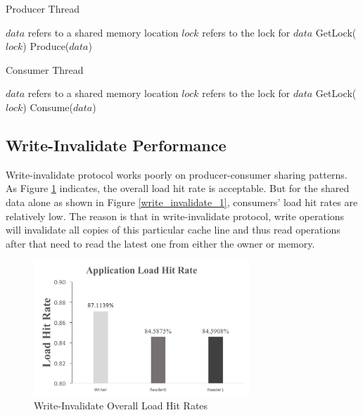 \documentclass[11pt,conference]{IEEEtran}
\begin{document}
\begin{algorithm}
\caption{Producer Thread}
\label{producer_thread}
\begin{algorithmic}[1]
\State $data$ refers to a shared memory location
\State $lock$ refers to the lock for $data$
    \State GetLock($lock$) 
    \State Produce($data$)
\EndWhile
\end{algorithmic}
\end{algorithm}

\begin{algorithm}
\caption{Consumer Thread}
\label{consumer_thread}
\begin{algorithmic}[1]
\State $data$ refers to a shared memory location
\State $lock$ refers to the lock for $data$
    \State GetLock($lock$) 
    \State Consume($data$)
\EndWhile
\end{algorithmic}
\end{algorithm}


\subsection{Write-Invalidate Performance}
Write-invalidate protocol works poorly on producer-consumer sharing patterns. As Figure \ref{write_invalidate} indicates, the overall load hit rate is acceptable. But for the shared data alone as shown in Figure \ref{write_invalidate_1}, consumers' load hit rates are relatively low. The reason is that in write-invalidate protocol, write operations will invalidate all copies of this particular cache line and thus read operations after that need to read the latest one from either the owner or memory.

\begin{figure}[!h]
\centering
\includegraphics[width=3.2in]{write_invalidate.png}
\caption{Write-Invalidate Overall Load Hit Rates}
\label{write_invalidate}
\end{figure}
\FloatBarrier
\end{document}
